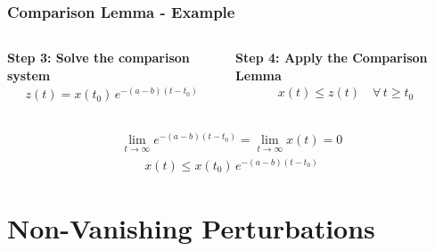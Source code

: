 \documentclass[student, noshadow, lsr, english, aspectratio=169, t]{ITR_LSR_slides}
\begin{document}
\begin{frame}
    \frametitle{Comparison Lemma - Example}
    \begin{columns}
        \textbf{Step 3: Solve the comparison system} \\
        \begin{align*}
            z(t) = x(t_0)\, e^{-(a - b)(t - t_0)}
        \end{align*}

        \textbf{Step 4: Apply the Comparison Lemma}
        \begin{align*}
            x(t) \leq z(t) \quad \forall\, t \geq t_0
        \end{align*}
    \end{columns}

    \vspace{0.3cm}
    \begin{tcolorbox}[title=Conclusion: Exponential Stability of the Perturbed System]
        \vspace{-0.4cm}
        \begin{align*}
            \lim_{t \to \infty} e^{-(a - b)(t - t_0)} = \lim_{t \to \infty} x(t) = 0
        \end{align*}
        \begin{align*}
            x(t) \leq x(t_0)\, e^{-(a - b)(t - t_0)}
        \end{align*}
    \end{tcolorbox}
\end{frame}

\section{Non-Vanishing Perturbations}
\end{document}
